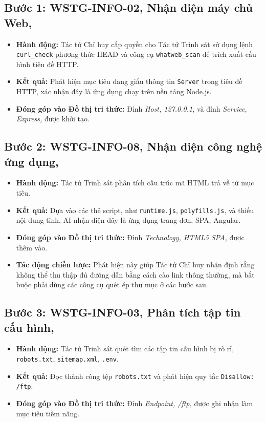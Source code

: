\subsection{Bước 1: WSTG-INFO-02, Nhận diện máy chủ Web,}
\begin{itemize}
    \item \textbf{Hành động:} Tác tử Chỉ huy cấp quyền cho Tác tử Trinh sát sử dụng lệnh \texttt{curl\_check} phương thức HEAD và công cụ \texttt{whatweb\_scan} để trích xuất cấu hình tiêu đề HTTP.
    \item \textbf{Kết quả:} Phát hiện mục tiêu đang giấu thông tin \texttt{Server} trong tiêu đề HTTP, xác nhận đây là ứng dụng chạy trên nền tảng Node.js.
    \item \textbf{Đóng góp vào Đồ thị tri thức:} Đỉnh \textit{Host, 127.0.0.1,} và đỉnh \textit{Service, Express,} được khởi tạo.
\end{itemize}

\subsection{Bước 2: WSTG-INFO-08, Nhận diện công nghệ ứng dụng,}
\begin{itemize}
    \item \textbf{Hành động:} Tác tử Trinh sát phân tích cấu trúc mã HTML trả về từ mục tiêu.
    \item \textbf{Kết quả:} Dựa vào các thẻ script, như \texttt{runtime.js}, \texttt{polyfills.js}, và thiếu nội dung tĩnh, AI nhận diện đây là ứng dụng trang đơn, SPA, Angular.
    \item \textbf{Đóng góp vào Đồ thị tri thức:} Đỉnh \textit{Technology, HTML5 SPA,} được thêm vào.
    \item \textbf{Tác động chiến lược:} Phát hiện này giúp Tác tử Chỉ huy nhận định rằng không thể thu thập đủ đường dẫn bằng cách cào link thông thường, mà bắt buộc phải dùng các công cụ quét ép thư mục ở các bước sau.
\end{itemize}

\subsection{Bước 3: WSTG-INFO-03, Phân tích tập tin cấu hình,}
\begin{itemize}
    \item \textbf{Hành động:} Tác tử Trinh sát quét tìm các tập tin cấu hình bị rò rỉ, \texttt{robots.txt}, \texttt{sitemap.xml}, \texttt{.env}.
    \item \textbf{Kết quả:} Đọc thành công tệp \texttt{robots.txt} và phát hiện quy tắc \texttt{Disallow: /ftp}.
    \item \textbf{Đóng góp vào Đồ thị tri thức:} Đỉnh \textit{Endpoint, /ftp,} được ghi nhận làm mục tiêu tiềm năng.
\end{itemize}

